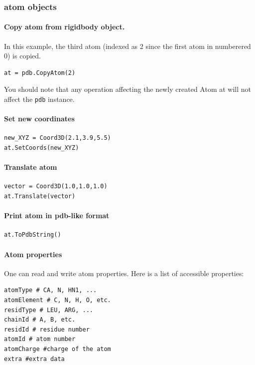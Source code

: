\documentclass[12pt,a4paper]{article}
\begin{document}
\subsubsection{atom objects}
\paragraph{Copy atom from rigidbody object.} 
In this example, the third atom (indexed as 2 since the first atom in numberered 0) is copied. 
\begin{verbatim}
at = pdb.CopyAtom(2)
\end{verbatim}
You should note that any operation affecting the newly created Atom at will not affect the \verb!pdb! instance.

\paragraph{Set new coordinates}
\begin{verbatim}
new_XYZ = Coord3D(2.1,3.9,5.5)
at.SetCoords(new_XYZ)
\end{verbatim}

\paragraph{Translate atom}
\begin{verbatim}
vector = Coord3D(1.0,1.0,1.0)
at.Translate(vector)
\end{verbatim}

\paragraph{Print atom in pdb-like format}
\begin{verbatim}
at.ToPdbString()
\end{verbatim}

\paragraph{Atom properties}
One can read and write atom properties. Here is a list of accessible properties:
\begin{verbatim}
atomType # CA, N, HN1, ...
atomElement # C, N, H, O, etc.
residType # LEU, ARG, ...
chainId # A, B, etc.
residId # residue number
atomId # atom number
atomCharge #charge of the atom
extra #extra data
\end{verbatim} 

\newpage
\end{document}
